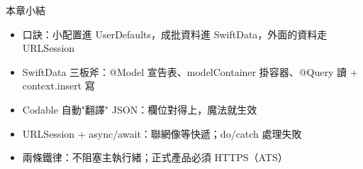 \begin{tcbsummary}{本章小結}
\begin{itemize}
  \item 口訣：小配置進 UserDefaults，成批資料進 SwiftData，外面的資料走 URLSession
  \item SwiftData 三板斧：@Model 宣告表、modelContainer 掛容器、@Query 讀 + context.insert 寫
  \item Codable 自動"翻譯" JSON：欄位對得上，魔法就生效
  \item URLSession + async/await：聯網像等快遞；do/catch 處理失敗
  \item 兩條鐵律：不阻塞主執行緒；正式產品必須 HTTPS（ATS）
\end{itemize}

\end{tcbsummary}

